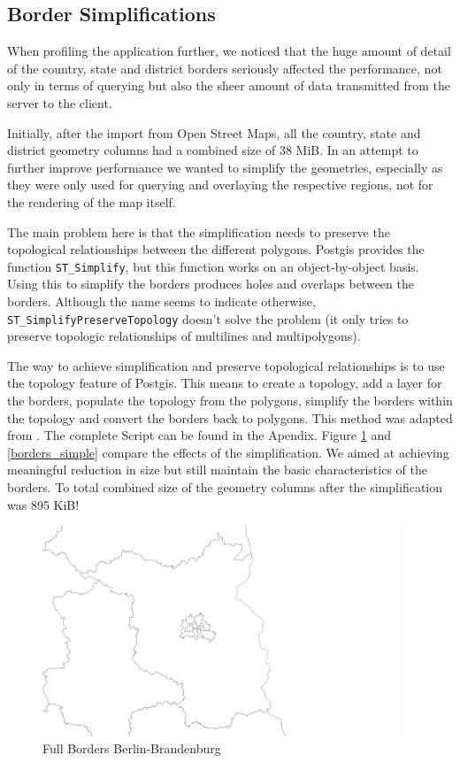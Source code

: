 \documentclass[paper=a4, fontsize=11pt]{scrartcl} %
\numberwithin{equation}{section} %
\numberwithin{figure}{section} %
\numberwithin{table}{section} %
\begin{document}
\subsection{Border Simplifications}	

When profiling the application further, we noticed that the huge amount of detail of the country, state and district borders seriously affected the performance, not only in terms of querying but also the sheer amount of data transmitted from the server to the client. 

Initially, after the import from Open Street Maps, all the country, state and district geometry columns had a combined size of 38 MiB. In an attempt to further improve performance we wanted to simplify the geometries, especially as they were only used for querying and overlaying the respective regions, not for the rendering of the map itself.

The main problem here is that the simplification needs to preserve the topological relationships between the different polygons. Postgis provides the function \lstinline{ST_Simplify}, but this function works on an object-by-object basis. Using this to simplify the borders produces holes and overlaps between the borders. Although the name seems to indicate otherwise, \lstinline{ST_SimplifyPreserveTopology} doesn't solve the problem (it only tries to preserve topologic relationships of multilines and multipolygons).

The way to achieve simplification and preserve topological relationships is to use the topology feature of Postgis. This means to create a topology, add a layer for the borders, populate the topology from the polygons, simplify the borders within the topology and convert the borders back to polygons. This method was adapted from 
	. The complete Script can be found in the Apendix. Figure \ref{borders_full} and \ref{borders_simple} compare the effects of the simplification. We aimed at achieving meaningful reduction in size but still maintain the basic characteristics of the borders. To total combined size of the geometry columns after the simplification was 895 KiB!

\begin{figure}[htbp]
	\centering
	\includegraphics[trim = 80mm 10mm 200mm 20mm, clip, width=0.95\textwidth]{pictures/borders_full}
	\caption{Full Borders Berlin-Brandenburg}
	\label{borders_full}
\end{figure}
\end{document}
